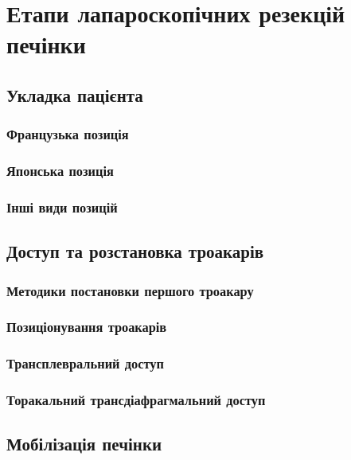 \chapter{Етапи лапароскопічних резекцій печінки}
\begin{refsection}
\section{Укладка пацієнта}

\subsection{Французька позиція}

\subsection{Японська позиція}

\subsection{Інші види позицій}

\section{Доступ та розстановка троакарів}

\subsection{Методики постановки першого троакару}

\subsection{Позиціонування троакарів}

\subsection{Трансплевральний доступ}

\subsection{Торакальний трансдіафрагмальний доступ}

\section{Мобілізація печінки}


\end{refsection}
